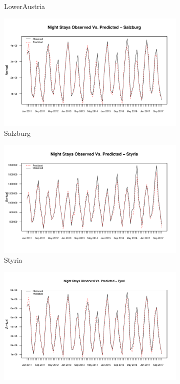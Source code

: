 \documentclass[a4paper,reqno,]{article}
\begin{document}
\begin{figure}[H]
\begin{subfigure}[b]{0.32\linewidth}
    \caption{LowerAustria}
  \end{subfigure}
  \begin{subfigure}[b]{0.32\linewidth}
    \includegraphics[width=\linewidth]{images/SVR/SalzburgSpaceTimeSVR.pdf}
    \caption{Salzburg}
  \end{subfigure}
  \begin{subfigure}[b]{0.32\linewidth}
    \includegraphics[width=\linewidth]{images/SVR/StyriaSpaceTimeSVR.pdf}
    \caption{Styria}
  \end{subfigure}
  \begin{subfigure}[b]{0.32\linewidth}
    \includegraphics[width=\linewidth]{images/SVR/TyrolSpaceTimeSVR.pdf}

\end{subfigure}
\end{figure}
\end{document}

